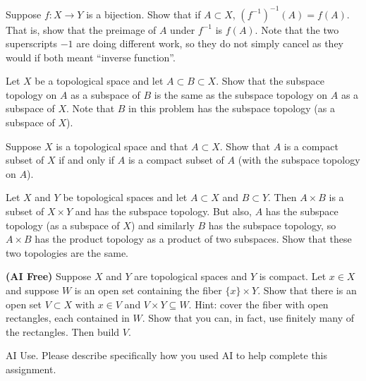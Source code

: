 \documentclass[minion]{homework}
\begin{document}
\begin{problems}

\problem Suppose $f:X\to Y$ is a bijection. Show that if $A\subset X$, $(f^{-1})^{-1}(A)=f(A)$.
That is, show that the preimage of $A$ under $f^{-1}$ is $f(A)$.  Note that the 
two superscripts $-1$ are doing different work, so they do not simply cancel 
as they would if both meant ``inverse function''.

\problem Let $X$ be a topological space and let $A\subset B\subset X$.
Show that the subspace topology on $A$ as a subspace of $B$ is the same
as the subspace topology on $A$ as a subspace of $X$.  Note that $B$ 
in this problem has the subspace topology (as a subspace of $X$).

\problem Suppose $X$ is a topological space and that $A\subset X$.
Show that $A$ is a compact subset of $X$ if and only if $A$ is a compact 
subset of $A$ (with the subspace topology on $A$).

\problem Let $X$ and $Y$ be topological spaces and let $A\subset X$ and $B\subset Y$.
Then $A\times B$ is a subset of $X\times Y$ and has the subspace topology.
But also, $A$ has the subspace topology (as a subspace of $X$) and similarly 
$B$ has the subspace topology, so $A\times B$ has the product topology 
as a product of two subspaces.  Show that these two topologies are the same.

\problem \textbf{(AI Free)}
Suppose $X$ and $Y$ are topological spaces and $Y$ is compact. Let $x\in X$
and suppose $W$ is an open set containing the fiber $\{x\}\times Y$.
Show that there is an open set $V\subset X$ with $x\in V$ and $V\times Y\subseteq W$.
Hint: cover the fiber with open rectangles, each contained in $W$.  Show that
you can, in fact, use finitely many of the rectangles.  Then build $V$.

\problem AI Use. Please describe specifically how you used AI to help complete this assignment.

\end{problems}
\end{document}

